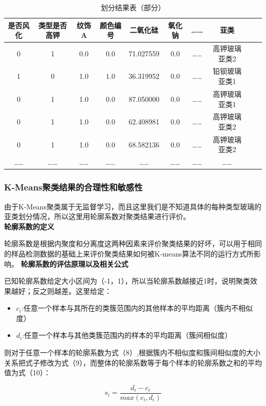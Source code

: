 \documentclass[withoutpreface,bwprint]{cumcmthesis}%
\begin{document}
	\begin{table}[!htb]
		\centering
		\caption{划分结果表（部分）}
		\begin{tabular}{cccccccccc}
			\toprule[1.5pt]
			是否风化 & 类型是否高钾&纹饰A&颜色编号&二氧化硅&氧化钠&……&亚类\\
			\midrule[1pt]
			0&1&0.0&0.0&71.027559 & 0.0&……&高钾玻璃亚类2\\
			\hline
			1&0&1.0&1.0&36.319952&0.0&……&铅钡玻璃亚类1\\	
			\hline
			0&1&1.0&0.0&87.050000&0.0&……&高钾玻璃亚类1\\	
			\hline
			0&1&1.0&0.0&62.408981&0.0&……&高钾玻璃亚类2\\
			\hline
			0&1&1.0&0.0&68.582136&0.0&……&高钾玻璃亚类2\\
			\hline
			…… &   ……     & ……    & ……& ……& ……& ……& …… \\
			\bottomrule[1.5pt]
		\end{tabular}
	\end{table}
    
    \newpage
    \subsubsection{K-Means聚类结果的合理性和敏感性}
    由于K-Means聚类属于无监督学习，而且这里我们是不知道具体的每种类型玻璃的亚类划分情况，所以这里用轮廓系数对聚类结果进行评价。\\
	\textbf{\uppercase\expandafter{} 轮廓系数的定义}
	
	轮廓系数是根据内聚度和分离度这两种因素来评价聚类结果的好坏，可以用于相同的样品检测数据的基础上来评价聚类结果如何被K-means算法不同的运行方式所影响。
	\textbf{\uppercase\expandafter{}轮廓系数的评估原理以及相关公式}
	
	已知轮廓系数给定大小区间为（-1，1），所以当轮廓系数越接近1时，说明聚类效果越好；反之则越差。这里给定：
	\begin{itemize}
		\item $c_{i}$:任意一个样本与其所在的类簇范围内的其他样本的平均距离（簇内不相似度）
		\item $d_{i}$:任意一个样本与其他类簇范围内的样本的平均距离（簇间相似度）\\
	\end{itemize}
	则对于任意一个样本的轮廓系数为式（8）,根据簇内不相似度和簇间相似度的大小关系把式子修改为式（9），而整体的轮廓系数等于每个样本的轮廓系数之和的平均值为式（10）：
	
	\begin{equation}
		s_{i} = \frac{ d_{i}-c_{i} }{max\left(c_{i},d_{i}\right)}
	\end{equation}
	
\end{document}
